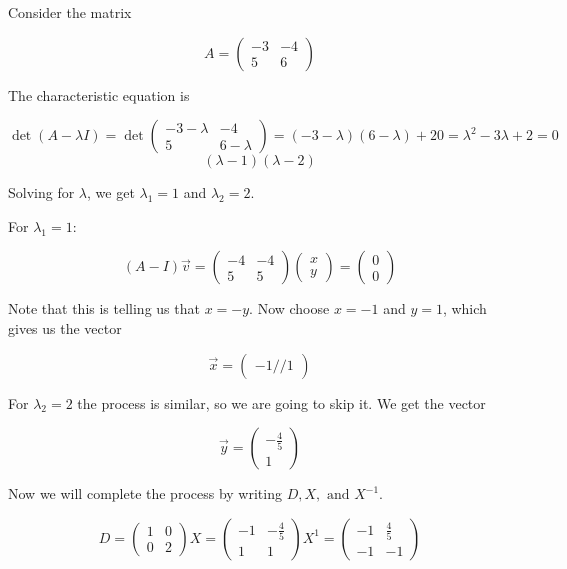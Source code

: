 Consider the matrix

\[
    A = \begin{pmatrix}
    -3 & -4 \\
    5 & 6
    \end{pmatrix}
\]


The characteristic equation is

\[
    \det(A - \lambda I) 
    = \det 
    \begin{pmatrix}
            -3 - \lambda & -4 \\
        5 & 6 - \lambda
    \end{pmatrix} 
    = (-3 - \lambda)(6 - \lambda) + 20 = \lambda^2 - 3\lambda + 2 = 0    
\]
\[
    (\lambda - 1)(\lambda - 2)
\]

Solving for \(\lambda\), we get \(\lambda_1 = 1\) and \(\lambda_2 = 2\).
\vspace{\baselineskip}

For \(\lambda_1 = 1\):

\[
   (A - I)\vec{v} = \begin{pmatrix}
    -4 & -4 \\
    5 & 5
    \end{pmatrix} \begin{pmatrix}
    x \\
    y
    \end{pmatrix} = \begin{pmatrix}
    0 \\
    0
    \end{pmatrix}
\]

Note that this is telling us that \(x = -y\). Now choose \(x = -1\) and \(y = 1\), which gives us 
the vector 

\[
    \vec{x} = \begin{pmatrix}
        -1 // 1
    \end{pmatrix}
\]

For \(\lambda_2 = 2\) the process is similar, so we are going to skip it. We get the vector

\[
    \vec{y} = \begin{pmatrix}
        -\frac{4}{5} \\ 1
    \end{pmatrix}
\]

Now we will complete the process by writing \(D, X, \text{ and } X^{-1}\).

\[
    D = \begin{pmatrix}
        1 & 0 \\
        0 & 2
    \end{pmatrix}
    X = \begin{pmatrix}
        -1  & -\frac{4}{5} \\
        1   &   1 
    \end{pmatrix}
    X^{1} = \begin{pmatrix}
        -1  & \frac{4}{5} \\
        -1   &   -1 
    \end{pmatrix}
\]


